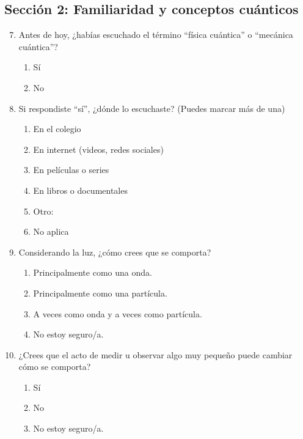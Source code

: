 \documentclass[10pt,a4paper]{article}
\begin{document}
\subsection{Sección 2: Familiaridad y conceptos cuánticos}
\begin{enumerate}
    \setcounter{enumi}{6} %
    \item Antes de hoy, ¿habías escuchado el término ``física cuántica'' o ``mecánica cuántica''?
    \begin{enumerate}[label=\alph*)]
        \item Sí
        \item No
    \end{enumerate}
    
    \item Si respondiste ``sí'', ¿dónde lo escuchaste? (Puedes marcar más de una)
    \begin{enumerate}[label=\alph*)]
        \item En el colegio
        \item En internet (videos, redes sociales)
        \item En películas o series
        \item En libros o documentales
        \item Otro: \underline{\hspace{3cm}}
        \item No aplica
    \end{enumerate}

    \item Considerando la luz, ¿cómo crees que se comporta?
    \begin{enumerate}[label=\alph*)]
        \item Principalmente como una onda.
        \item Principalmente como una partícula.
        \item A veces como onda y a veces como partícula.
        \item No estoy seguro/a.
    \end{enumerate}

    \item ¿Crees que el acto de medir u observar algo muy pequeño puede cambiar cómo se comporta?
    \begin{enumerate}[label=\alph*)]
        \item Sí
        \item No
        \item No estoy seguro/a.
    \end{enumerate}


\end{enumerate}
\end{document}
